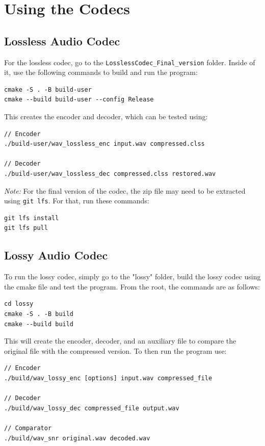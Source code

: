 \section{Using the Codecs}

\subsection{Lossless Audio Codec}

For the lossless codec, go to the \texttt{LosslessCodec\_Final\_version} folder. Inside of it, use the following commands to build and run the program:

\begin{verbatim}
cmake -S . -B build-user
cmake --build build-user --config Release
\end{verbatim}

This creates the encoder and decoder, which can be tested using:

\begin{verbatim}
// Encoder
./build-user/wav_lossless_enc input.wav compressed.clss

// Decoder
./build-user/wav_lossless_dec compressed.clss restored.wav
\end{verbatim}

\noindent\textit{Note:} For the final version of the codec, the zip file may need to be extracted using \texttt{git lfs}. For that, run these commands:

\begin{verbatim}
git lfs install
git lfs pull
\end{verbatim}


\subsection{Lossy Audio Codec}

To run the lossy codec, simply go to the "lossy" folder, build the lossy codec using the cmake file and test the program. From the root, the commands are as follows:

\begin{verbatim}
cd lossy
cmake -S . -B build
cmake --build build
\end{verbatim}

This will create the encoder, decoder, and an auxiliary file to compare the original file with the compressed version. To then run the program use:

\begin{verbatim}
// Encoder
./build/wav_lossy_enc [options] input.wav compressed_file

// Decoder
./build/wav_lossy_dec compressed_file output.wav

// Comparator
./build/wav_snr original.wav decoded.wav
\end{verbatim}


